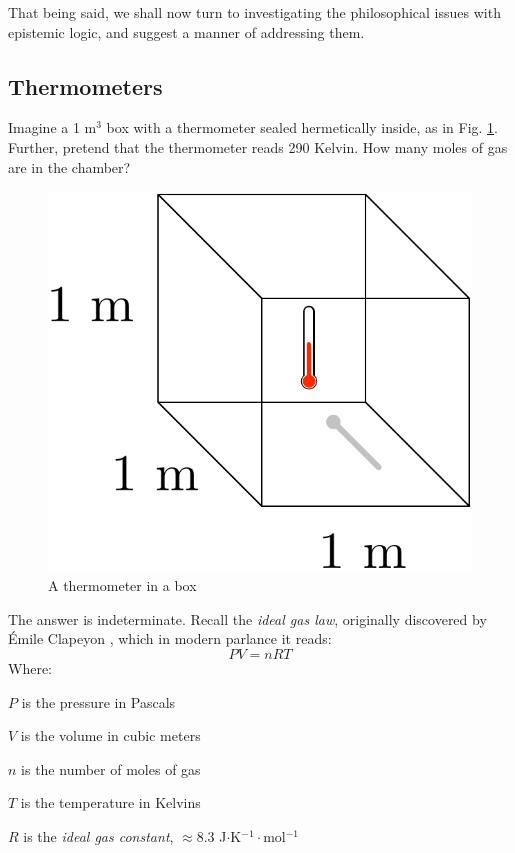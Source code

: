 \documentclass[11pt]{article}
\numberwithin{equation}{subsection}
\begin{document}
That being said, we shall now turn to investigating the philosophical
issues with epistemic logic, and suggest a manner of addressing them.

\subsection{Thermometers}\label{thermometers}

Imagine a 1 m$^3$ box with a thermometer sealed hermetically inside,
as in Fig.  \ref{fig:therm1}.  Further, pretend that the thermometer
reads 290 Kelvin.  How many moles of gas are in the chamber?

\begin{figure}[ht]
\begin{center}
\includegraphics[scale=.5]{thermometer.pdf}
\end{center}
\caption{A thermometer in a box}
\label{fig:therm1}
\end{figure}

The answer is indeterminate.  Recall the \emph{ideal gas law}, originally discovered by \'{E}mile Clapeyon
\citep{clapeyron_mmoire_1834}, which in modern parlance it reads:
\[ P V = n R T\]
Where:
\begin{bul}
\item $P$ is the pressure in Pascals
\item $V$ is the volume in cubic meters
\item $n$ is the number of moles of gas
\item $T$ is the temperature in Kelvins
\item $R$ is the \emph{ideal gas constant}, $\approx 8.3$
  J$\cdot$K$^{-1}\cdot$mol$^{-1}$
\end{bul}
\end{document}
